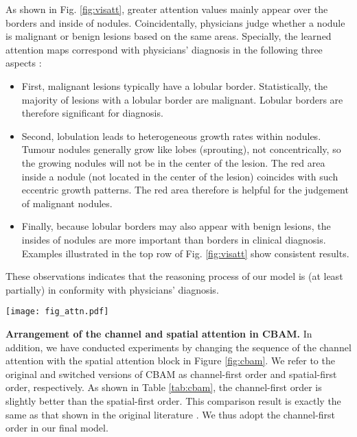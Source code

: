 \documentclass[final,5p,times,twocolumn]{elsarticle}
\begin{document}
As shown in Fig. \ref{fig:visatt}, greater attention values mainly appear over the borders and inside of nodules. Coincidentally, physicians judge whether a nodule is malignant or benign lesions based on the same areas. Specially, the learned attention maps correspond with physicians' diagnosis in the following three aspects \cite{siegelman1986pulmonary}:
\begin{itemize}
\item First, malignant lesions typically have a lobular border. Statistically, the majority of lesions with a lobular border are malignant. Lobular borders are therefore significant for diagnosis.

\item Second, lobulation leads to heterogeneous growth rates within nodules. Tumour nodules generally grow like lobes (sprouting), not concentrically, so the growing nodules will not be in the center of the lesion. The red area inside a nodule (not located in the center of the lesion) coincides with such eccentric growth patterns. The red area therefore is helpful for the judgement of malignant nodules. 

\item Finally, because lobular borders may also appear with benign lesions, the insides of nodules are more important than borders in clinical diagnosis. Examples illustrated in the top row of Fig. \ref{fig:visatt} show consistent results.
\end{itemize}
These observations indicates that the reasoning process of our model is (at least partially) in conformity with physicians' diagnosis.


\begin{figure*}
\centering
\texttt{[image: fig\_attn.pdf]} \\
\caption{Visualization of the learned spatial attention. Each example includes two images: the left one is the CT image patch; the right one is the corresponding attention map. Here, red colors indicate high attention values, and blue indicates low attention values.}
\label{fig:visatt}
\end{figure*}

\textbf{Arrangement of the channel and spatial attention in CBAM.} 
In addition, we have conducted experiments by changing the sequence of the channel attention with the spatial attention block in Figure \ref{fig:cbam}. We refer to the original and switched versions of CBAM as channel-first order and spatial-first order, respectively. As shown in Table \ref{tab:cbam}, the channel-first order is slightly better than the spatial-first order. This comparison result is exactly the same as that shown in the original literature \cite{Woo2018CBAM}. We thus adopt the channel-first order in our final model. 
\end{document}
